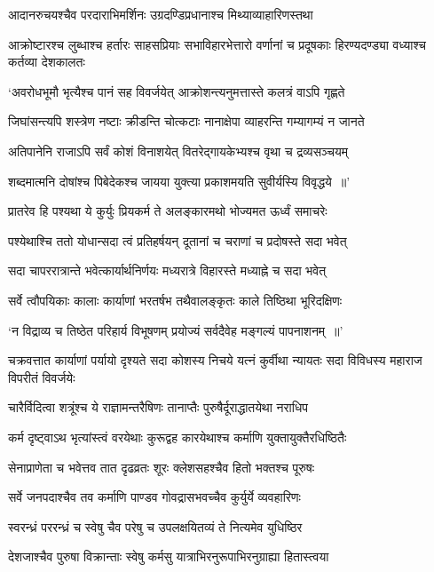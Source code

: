 \twolineshloka
{आदानरुचयश्चैव परदाराभिमर्शिनः}
{उग्रदण्डिप्रधानाश्च मिथ्याव्याहारिणस्तथा}


\threelineshloka
{आक्रोष्टारश्च लुब्धाश्च हर्तारः साहसप्रियाः}
{सभाविहारभेत्तारो वर्णानां च प्रदूषकाः}
{हिरण्यदण्ड्या वध्याश्च कर्तव्या देशकालतः}


\twolineshloka
{`अवरोधभूमौ भृत्यैश्च पानं सह विवर्जयेत्}
{आक्रोशन्त्यनुमत्तास्ते कलत्रं वाऽपि गृह्णते}


\twolineshloka
{जिघांसन्त्यपि शस्त्रेण नष्टाः क्रीडन्ति चोत्कटाः}
{नानाक्षेपा व्याहरन्ति गम्यागम्यं न जानते}


\twolineshloka
{अतिपानेनि राजाऽपि सर्वं कोशं विनाशयेत्}
{वितरेद्गायकेभ्यश्च वृथा च द्रव्यसञ्चयम्}


\twolineshloka
{शब्दमात्मनि दोषांश्च पिबेदेकश्च जायया}
{युक्त्या प्रकाशमयति सुवीर्यस्यि विवृद्धये ॥'}


\twolineshloka
{प्रातरेव हि पश्यथा ये कुर्युः प्रियकर्म ते}
{अलङ्कारमथो भोज्यमत ऊर्ध्वं समाचरेः}


\twolineshloka
{पश्येथाश्चि ततो योधान्सदा त्वं प्रतिहर्षयन्}
{दूतानां च चराणां च प्रदोषस्ते सदा भवेत्}


\twolineshloka
{सदा चापररात्रान्ते भवेत्कार्यार्थनिर्णयः}
{मध्यरात्रे विहारस्ते मध्याह्ने च सदा भवेत्}


\twolineshloka
{सर्वे त्वौपयिकाः कालाः कार्याणां भरतर्षभ}
{तथैवालङ्कृतः काले तिष्ठिथा भूरिदक्षिणः}


\twolineshloka
{`न विद्राव्य च तिष्ठेत परिहार्य विभूषणम्}
{प्रयोज्यं सर्वदैवेह मङ्गल्यं पापनाशनम् ॥'}


\threelineshloka
{चक्रवत्तात कार्याणां पर्यायो दृश्यते सदा}
{कोशस्य निचये यत्नं कुर्वीथा न्यायतः सदा}
{विविधस्य महाराज विपरीतं विवर्जयेः}


\twolineshloka
{चारैर्विदित्वा शत्रूंश्च ये राज्ञामन्तरैषिणः}
{तानाप्तैः पुरुषैर्दूराद्धातयेथा नराधिप}


\twolineshloka
{कर्म दृष्ट्वाऽथ भृत्यांस्त्वं वरयेथाः कुरूद्वह}
{कारयेथाश्च कर्माणि युक्तायुक्तैरधिष्ठितैः}


\twolineshloka
{सेनाप्राणेता च भवेत्तव तात दृढव्रतः}
{शूरः क्लेशसहश्चैव हितो भक्तश्च पूरुषः}


\twolineshloka
{सर्वे जनपदाश्चैव तव कर्माणि पाण्डव}
{गोवद्रासभवच्चैव कुर्युर्ये व्यवहारिणः}


\twolineshloka
{स्वरन्ध्रं पररन्ध्रं च स्वेषु चैव परेषु च}
{उपलक्षयितव्यं ते नित्यमेव युधिष्ठिर}


\twolineshloka
{देशजाश्चैव पुरुषा विक्रान्ताः स्वेषु कर्मसु}
{यात्राभिरनुरूपाभिरनुग्राह्या हितास्त्वया}



